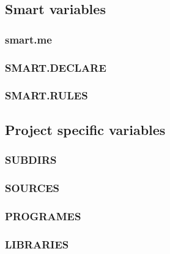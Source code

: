 \subsection{Smart variables}
\subsubsection{smart.me}
\subsubsection{SMART.DECLARE}
\subsubsection{SMART.RULES}
\subsection{Project specific variables}
\subsubsection{SUBDIRS}
\subsubsection{SOURCES}
\subsubsection{PROGRAMES}
\subsubsection{LIBRARIES}
